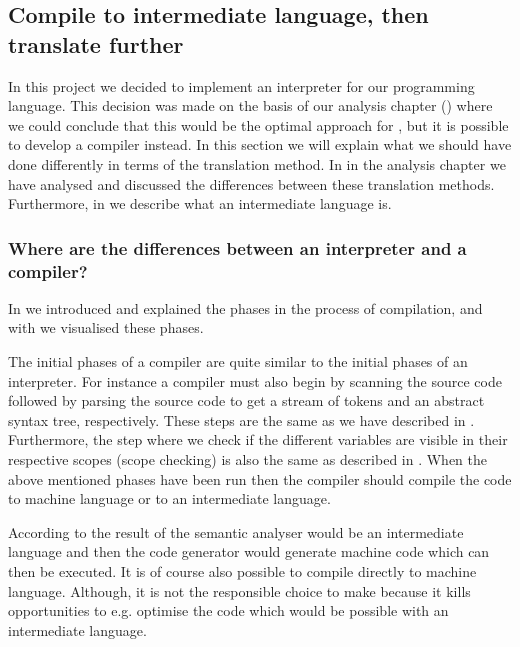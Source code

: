 \subsection{Compile to intermediate language, then translate further}
\label{sec:compiletointermediate}

In this project we decided to implement an interpreter for our programming
language. This decision was made on the basis of our analysis chapter
() where we could conclude that this would be the optimal
approach for \productname{}, but it is possible to develop a compiler instead. In
this section we will explain what we should have done differently in terms of
the translation method. In  in the
analysis chapter we have analysed and discussed the differences between these
translation methods. Furthermore, in  we
describe what an intermediate language is.

\subsubsection{Where are the differences between an interpreter and a compiler?}

In  we introduced and explained the phases in the
process of compilation, and with  we visualised
these phases.

The initial phases of a compiler are quite similar to the initial phases of an
interpreter. For instance a compiler must also begin by scanning the source code
followed by parsing the source code to get a stream of tokens and an abstract
syntax tree, respectively. These steps are the same as we have described in
. Furthermore, the step where we check if the
different variables are visible in their respective scopes (scope checking) is
also the same as described in . When the above
mentioned phases have been run then the compiler should compile the code to
machine language or to an intermediate language.

According to  the result of the semantic analyser
would be an intermediate language and then the code generator would generate
machine code which can then be executed. It is of course also possible to compile
directly to machine language. Although, it is not the responsible choice to make 
because it kills opportunities to e.g. optimise the code which would be possible 
with an intermediate language.

